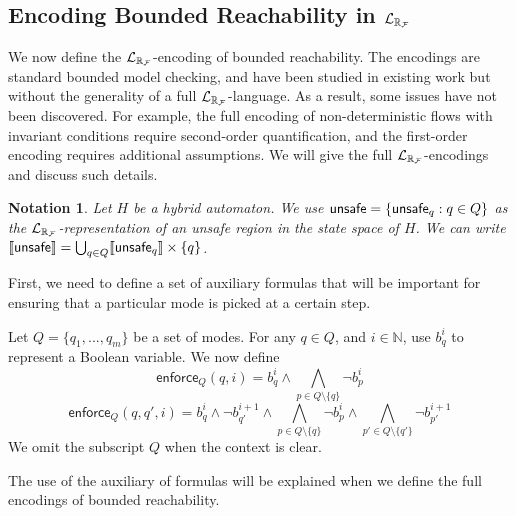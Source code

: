 \documentclass[12pt]{llncs}
\newtheorem{notation}[theorem]{Notation}
\newcommand{\enforce}{\mathsf{enforce}}
\begin{document}
\subsection{Encoding Bounded Reachability in $\mathcal{L}_{\mathbb{R}_{\mathcal{F}}}$}
We now define the $\mathcal{L}_{\mathbb{R}_{\mathcal{F}}}$-encoding of bounded reachability. The encodings are standard bounded model checking, and have been studied in existing work but without the generality of a full $\mathcal{L}_{\mathbb{R}_{\mathcal{F}}}$-language. As a result, some issues have not been discovered. For example, the full encoding of non-deterministic flows with invariant conditions require second-order quantification, and the first-order encoding requires additional assumptions. We will give the full $\mathcal{L}_{\mathbb{R}_{\mathcal{F}}}$-encodings and discuss such details.
\begin{notation}
Let $H$ be a hybrid automaton. We use $\mathsf{unsafe} = \{\mathsf{unsafe}_q:q\in Q\}$ as the $\mathcal{L}_{\mathbb{R}_{\mathcal{F}}}$-representation of an unsafe region in the state space of $H$. We can write $\llbracket \mathsf{unsafe}\rrbracket = \bigcup_{q\in Q} \llbracket \mathsf{unsafe}_q \rrbracket\times \{q\}$.
\end{notation}
First, we need to define a set of auxiliary formulas that will be important for ensuring that a particular mode is picked at a certain step.
\begin{definition}
Let $Q = \{q_1,...,q_m\}$ be a set of modes. For any $q\in Q$, and $i\in\mathbb{N}$, use  $b_{q}^i$ to represent a Boolean variable. We now define
$$\enforce_Q(q,i) = b^i_{q} \wedge \bigwedge_{p\in Q\setminus\{q\}}\neg b^{i}_{p}$$
$$\enforce_Q(q, q',i) = b^{i}_{q}\wedge \neg b^{i+1}_{q'} \wedge \bigwedge_{p\in Q\setminus\{q\}} \neg b^i_{p} \wedge \bigwedge_{p'\in Q\setminus\{q'\}} \neg b^{i+1}_{p'}$$
We omit the subscript $Q$ when the context is clear.\end{definition}
The use of the auxiliary of formulas will be explained when we define the full encodings of bounded reachability.
\end{document}
